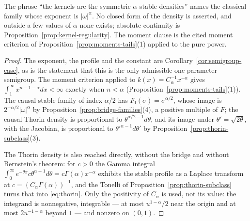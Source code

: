 The phrase ``the kernels are the symmetric $\alpha$-stable densities'' names the classical
family whose exponent is $|\omega|^\alpha$. No closed form of the density is asserted, and
outside a few values of $\alpha$ none exists; absolute continuity is
Proposition~\ref{prop:kernel-regularity}. The moment clause is the cited moment criterion of
Proposition~\ref{prop:moments-tails}(1) applied to the pure power.

\begin{proof}
The exponent, the profile and the constant are Corollary~\ref{cor:semigroup-case}, as is the
statement that this is the only admissible one-parameter semigroup. The moment criterion applied
to $k(x) = C_\alpha^{-1}x^{-\alpha}$ gives $\int_1^\infty x^{n-1-\alpha}dx < \infty$ exactly
when $n < \alpha$ (Proposition~\ref{prop:moments-tails}(1)). The causal stable family of index
$\alpha/2$ has $F_{\mathrm I}(\sigma) = \sigma^{\alpha/2}$, whose image is
$2^{-\alpha/2}|\omega|^{\alpha}$ by Proposition~\ref{prop:bridge-families}(4), a positive
multiple of $F$; the causal Thorin density is proportional to $\theta^{\alpha/2-1}d\theta$, and
its image under $\theta' = \sqrt{2\theta}$, with the Jacobian, is proportional to
$\theta'^{\alpha-1}d\theta'$ by Proposition~\ref{prop:thorin-subclass}(3).

The Thorin density is also reached directly, without the bridge and without Bernstein's
theorem: for $c > 0$ the Gamma integral
$\int_0^\infty e^{-\theta x}c\theta^{\alpha-1}d\theta = c\Gamma(\alpha)x^{-\alpha}$ exhibits the
stable profile as a Laplace transform at $c = (C_\alpha\Gamma(\alpha))^{-1}$, and the Tonelli of
Proposition~\ref{prop:thorin-subclass} turns that into \ref{eq:thorin}. Only the positivity of
$C_\alpha$ is used, not its value: the integrand is nonnegative, integrable --- at most
$u^{1-\alpha}/2$ near the origin and at most $2u^{-1-\alpha}$ beyond $1$ --- and nonzero on
$(0,1)$.
\end{proof}
